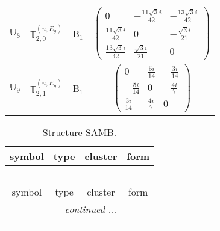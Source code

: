 \documentclass[fleqn,10pt,landscape]{article}
\begin{document}
\begin{itemize}
\begin{center}
\begin{longtable}{c|c|c|c}
$ \mathbb{U}_{8} $ & $\mathbb{T}_{2,0}^{(u,E_{g})}$ & B$_{1}$ & $\begin{pmatrix} 0 & - \frac{11 \sqrt{3} i}{42} & - \frac{13 \sqrt{3} i}{42} \\ \frac{11 \sqrt{3} i}{42} & 0 & - \frac{\sqrt{3} i}{21} \\ \frac{13 \sqrt{3} i}{42} & \frac{\sqrt{3} i}{21} & 0 \end{pmatrix}$ \\
$ \mathbb{U}_{9} $ & $\mathbb{T}_{2,1}^{(u,E_{g})}$ & B$_{1}$ & $\begin{pmatrix} 0 & \frac{5 i}{14} & - \frac{3 i}{14} \\ - \frac{5 i}{14} & 0 & - \frac{4 i}{7} \\ \frac{3 i}{14} & \frac{4 i}{7} & 0 \end{pmatrix}$ \\
\end{longtable}
\end{center}
\begin{center}
\renewcommand{\arraystretch}{1.3}
\begin{longtable}{c|c|c|c}
\caption{Structure SAMB.}
 \\
 \hline \hline
symbol & type & cluster & form \\ \hline \endfirsthead

\multicolumn{3}{l}{\tablename\ \thetable{}} \\
 \hline \hline
symbol & type & cluster & form \\ \hline \endhead

 \hline \hline
\multicolumn{3}{r}{\footnotesize\it continued ...} \\ \endfoot

 \hline \hline
\multicolumn{3}{r}{} \\ \endlastfoot


\end{longtable}
\end{center}
\end{itemize}
\end{document}

